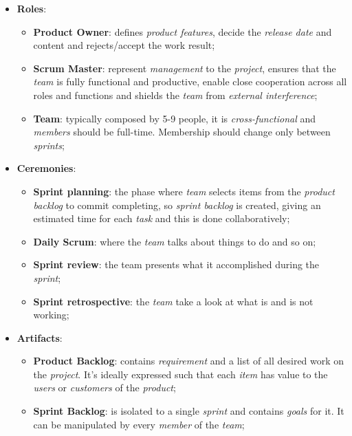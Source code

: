 \documentclass{article}
\begin{document}
\begin{itemize}
\item \textbf{Roles}:
\begin{itemize}
\item \textbf{Product Owner}: defines \emph{product features}, decide the \emph{release date} and content and rejects/accept the work result;
\item \textbf{Scrum Master}: represent \emph{management} to the \emph{project}, ensures that the \emph{team} is fully functional and productive, enable close cooperation across all roles and functions and shields the \emph{team} from \emph{external interference};
\item \textbf{Team}: typically composed by 5-9 people, it is \emph{cross-functional} and \emph{members} should be full-time. Membership should change only between \emph{sprints};
\end{itemize}
\item \textbf{Ceremonies}:
\begin{itemize}
\item \textbf{Sprint planning}: the phase where \emph{team} selects items from the \emph{product backlog} to commit completing, so \emph{sprint backlog} is created, giving an estimated time for each \emph{task} and this is done collaboratively;
\item \textbf{Daily Scrum}: where the \emph{team} talks about things to do and so on;
\item \textbf{Sprint review}: the team presents what it accomplished during the \emph{sprint};
\item \textbf{Sprint retrospective}: the \emph{team} take a look at what is and is not working;
\end{itemize}
\item \textbf{Artifacts}:
\begin{itemize}
\item \textbf{Product Backlog}: contains \emph{requirement} and a list of all desired work on the \emph{project}. It's ideally expressed such that each \emph{item} has value to the \emph{users} or \emph{customers} of the \emph{product};
\item \textbf{Sprint Backlog}: is isolated to a single \emph{sprint} and contains \emph{goals} for it. It can be manipulated by every \emph{member} of the \emph{team};
\end{itemize}
\end{itemize}
\end{document}
